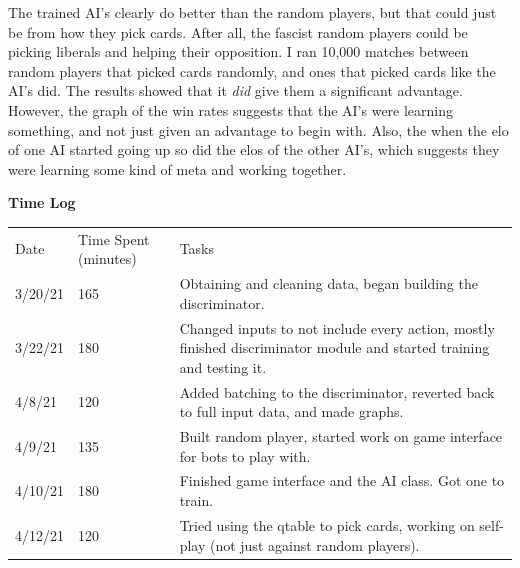 \documentclass[]{article}
\begin{document}
The trained AI's clearly do better than the random players, but that could just be from how they pick cards. After all, the fascist random players could be picking liberals and helping their opposition. I ran 10,000 matches between random players that picked cards randomly, and ones that picked cards like the AI's did. The results showed that it \emph{did} give them a significant advantage. However, the graph of the win rates suggests that the AI's were learning something, and not just given an advantage to begin with. Also, the when the elo of one AI started going up so did the elos of the other AI's, which suggests they were learning some kind of meta and working together.
\newpage
\noindent
\centerline{\textbf{Time Log}}
\renewcommand{\arraystretch}{2}
\begin{table}[H]
	\begin{tabular}{|P{0.1\textwidth}|P{0.15\textwidth}|p{0.75\textwidth}|}
		Date    & Time Spent (minutes) & Tasks                                                                                                                                                                                                                                                                                                \\ 
		3/20/21 & 165                  & Obtaining and cleaning data, began building the discriminator.                                                                                                                                                   
		\\ 
		3/22/21 & 180                  & Changed inputs to not include every action, mostly finished discriminator module and started training and testing it.   
		\\ 
		4/8/21  & 120                  & Added batching to the discriminator, reverted back to full input data, and made graphs.  
		\\ 
		4/9/21  & 135                  & Built random player, started work on game interface for bots to play with.    
		\\ 
		4/10/21 & 180                  & Finished game interface and the AI class. Got one to train.                                                                                                                                                       
		\\ 
		4/12/21 & 120                  & Tried using the qtable to pick cards, working on self-play (not just against random players).             

\end{tabular}
\end{table}
\end{document}
